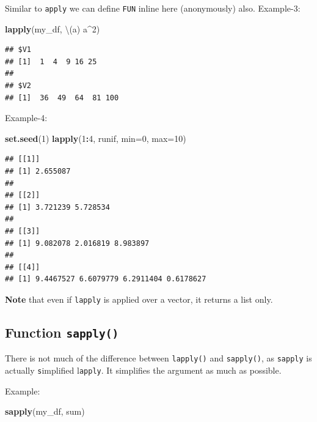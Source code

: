 \documentclass[
]{book}
\newenvironment{Shaded}{\begin{snugshade}}{\end{snugshade}}
\newcommand{\AttributeTok}[1]{\textcolor[rgb]{0.13,0.29,0.53}{#1}}
\newcommand{\DecValTok}[1]{\textcolor[rgb]{0.00,0.00,0.81}{#1}}
\newcommand{\FunctionTok}[1]{\textcolor[rgb]{0.13,0.29,0.53}{\textbf{#1}}}
\newcommand{\NormalTok}[1]{#1}
\newcommand{\SpecialCharTok}[1]{\textcolor[rgb]{0.81,0.36,0.00}{\textbf{#1}}}
\begin{document}
Similar to \texttt{apply} we can define \texttt{FUN} inline here (anonymously) also. Example-3:

\begin{Shaded}
\begin{Highlighting}[]
\FunctionTok{lapply}\NormalTok{(my\_df, \textbackslash{}(a) a}\SpecialCharTok{\^{}}\DecValTok{2}\NormalTok{) }
\end{Highlighting}
\end{Shaded}

\begin{verbatim}
## $V1
## [1]  1  4  9 16 25
## 
## $V2
## [1]  36  49  64  81 100
\end{verbatim}

Example-4:

\begin{Shaded}
\begin{Highlighting}[]
\FunctionTok{set.seed}\NormalTok{(}\DecValTok{1}\NormalTok{)}
\FunctionTok{lapply}\NormalTok{(}\DecValTok{1}\SpecialCharTok{:}\DecValTok{4}\NormalTok{, runif, }\AttributeTok{min=}\DecValTok{0}\NormalTok{, }\AttributeTok{max=}\DecValTok{10}\NormalTok{)}
\end{Highlighting}
\end{Shaded}

\begin{verbatim}
## [[1]]
## [1] 2.655087
## 
## [[2]]
## [1] 3.721239 5.728534
## 
## [[3]]
## [1] 9.082078 2.016819 8.983897
## 
## [[4]]
## [1] 9.4467527 6.6079779 6.2911404 0.6178627
\end{verbatim}

\textbf{Note} that even if \texttt{lapply} is applied over a vector, it returns a list only.

\hypertarget{function-sapply}{%
\subsection{\texorpdfstring{Function \texttt{sapply()}}{Function sapply()}}\label{function-sapply}}

There is not much of the difference between \texttt{lapply()} and \texttt{sapply()}, as \texttt{sapply} is actually \texttt{s}implified l\texttt{apply}. It simplifies the argument as much as possible.

Example:

\begin{Shaded}
\begin{Highlighting}[]
\FunctionTok{sapply}\NormalTok{(my\_df, sum)}
\end{Highlighting}
\end{Shaded}
\end{document}
